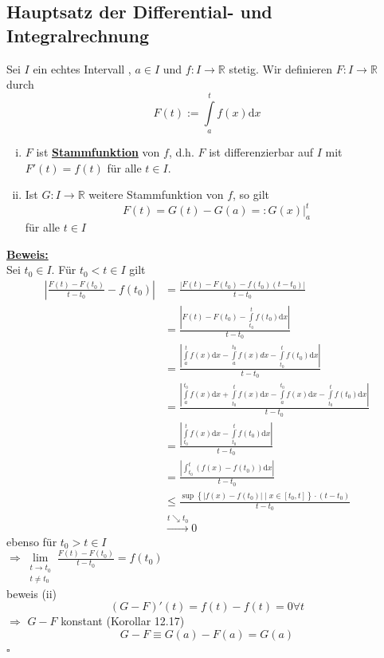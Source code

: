 \subsection{Hauptsatz der Differential- und Integralrechnung} %
\label{sub:hauptsatz_der_differential_und_integralrechnung}
Sei $I$ ein echtes Intervall , $a \in I$ und $f : I \to \mathds{R}$ stetig. Wir definieren $F : I \to \mathds{R}$ durch
\[
	F(t) := \int\limits_{a}^{t} \! f(x)  \mathrm{d}x 
\]
\begin{enumerate}[(i)]
	\item $F$ ist \underline{\textbf{Stammfunktion}} von $f$, d.h. $F$ ist differenzierbar auf $I$ mit $F'(t)=f(t)$ für alle $t \in I$.
	\item Ist $G : I \to \mathds{R}$ weitere Stammfunktion von $f$, so gilt
	\[
		F(t) = G(t) -G(a) =: G (x)\Big|_a^t
	\]
	für alle $t \in I$
\end{enumerate}
\underline{\textbf{Beweis:}} \\
Sei $t_0 \in I$. Für $t_0 < t \in I$ gilt 
\begin{align*}
	\left| \frac{F(t)-F(t_0)}{t-t_0} - f(t_0) \right| &= \frac{ \left| F(t)-F(t_0) - f(t_0) (t-t_0) \right|}{t-t_0} \\
	&= \frac{ \left| F(t)- F(t_0)- \int\limits_{t_0} ^{t} \! f(t_0)  \mathrm{d}x  \right| }{t-t_0} \\
	&= \frac{\left| \int\limits_{a} ^{t} \! f(x)  \mathrm{d}x - \int\limits_{a} ^{t_0} \! f(x) dx  - \int\limits_{t_0} ^{t} \! f(t_0)  \mathrm{d}x  \right|}{t-t_0} \\
	&= \frac{ \left| \int\limits_{a}^{t_0} \! f(x)  \mathrm{d}x + \int\limits_{t_0}^{t} \! f(x)  \mathrm{d}x 
	- \int\limits_{a}^{t_0} \! f(x)  \mathrm{d}x -  \int\limits_{t_0} ^{t} \! f(t_0)  \mathrm{d}x \right| }{t-t_0}  \\
	&= \frac{ \left| \int\limits_{t_0}^{t} \! f(x)  \mathrm{d}x - \int\limits_{t_0}^{t} \! f(t_0)  \mathrm{d}x \right|  }{t-t_0} \\
	&= \frac{\left| \int_{t_0} ^{t} \! \left( f(x) - f(t_0) \right)  \mathrm{d}x    \right|}{t-t_0}  \\
	&\le \frac{\sup \left\{   |f(x) - f(t_0)| \mid x \in [t_0 ,t] \right\} \cdot (t- t_0)}{t-t_0} \\
	& \xrightarrow{t \searrow t_0}0  
\end{align*}
ebenso für $t_0 > t \in I$ \\
$\Rightarrow \lim\limits_{\substack{t \to t_0 \\ t \not= t_0}} \frac{F(t)-F(t_0)}{t-t_0} = f(t_0)  $
\vspace{10pt} \\
beweis (ii) \\
\[
	(G-F)'(t)= f(t)- f(t) = 0 \forall t
\]
$\Rightarrow $ $G-F$ konstant (Korollar 12.17)
\[
	G-F \equiv G(a)- F(a)= G(a)
\]
\hfill \( \square \)

